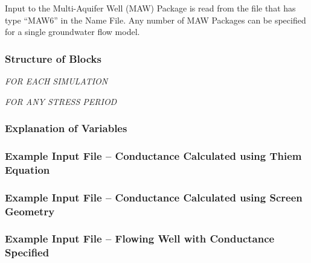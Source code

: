 Input to the Multi-Aquifer Well (MAW) Package is read from the file that has type ``MAW6'' in the Name File.  Any number of MAW Packages can be specified for a single groundwater flow model.

\vspace{5mm}
\subsubsection{Structure of Blocks}
\vspace{5mm}

\noindent \textit{FOR EACH SIMULATION}




\vspace{5mm}
\noindent \textit{FOR ANY STRESS PERIOD}


\vspace{5mm}
\subsubsection{Explanation of Variables}
\begin{description}

\end{description}

\vspace{5mm}
\subsubsection{Example Input File -- Conductance Calculated using Thiem Equation}

\subsubsection{Example Input File -- Conductance Calculated using Screen Geometry}

\subsubsection{Example Input File -- Flowing Well with Conductance Specified}


